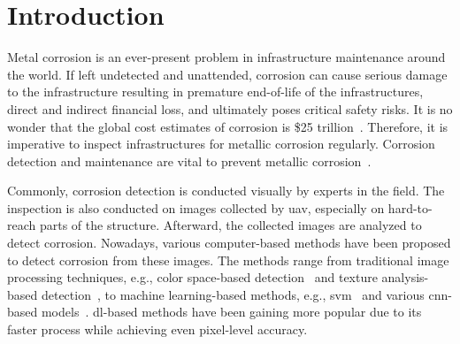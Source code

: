 \documentclass[mathematics,article,submit,pdftex,moreauthors]{Definitions/mdpi}
\begin{document}
\section{Introduction}

Metal corrosion is an ever-present problem in infrastructure maintenance around the world. If left undetected
and unattended, corrosion can cause serious damage to the infrastructure
resulting in premature end-of-life of the infrastructures,
direct and indirect financial loss, 
and ultimately poses critical safety risks. It 
is no wonder that the global cost estimates of
corrosion is \$25 trillion~\cite{Koch2016}.
Therefore, it is imperative to
inspect infrastructures for metallic corrosion
regularly. Corrosion detection and maintenance
are vital to prevent metallic corrosion~\cite{Wang2019}.

Commonly, corrosion detection is conducted 
visually by experts in the field. The inspection is 
also conducted on images collected by \ac{uav}, especially
on hard-to-reach parts of the structure.
Afterward, the collected images are analyzed to detect
corrosion. Nowadays, various computer-based
methods have been proposed to detect corrosion
from these images. The methods range from
traditional image processing techniques,
e.g., color space-based detection~\cite{Igoe2016} 
and texture analysis-based detection~\cite{Pascual2014},
to machine learning-based methods, e.g.,
\ac{svm}~\cite{Chen2012} and various 
\ac{cnn}-based models~\cite{Nash2022, Liu2023}.
\ac{dl}-based methods have been gaining more
popular due to its faster process while achieving
even pixel-level accuracy. 
\end{document}
